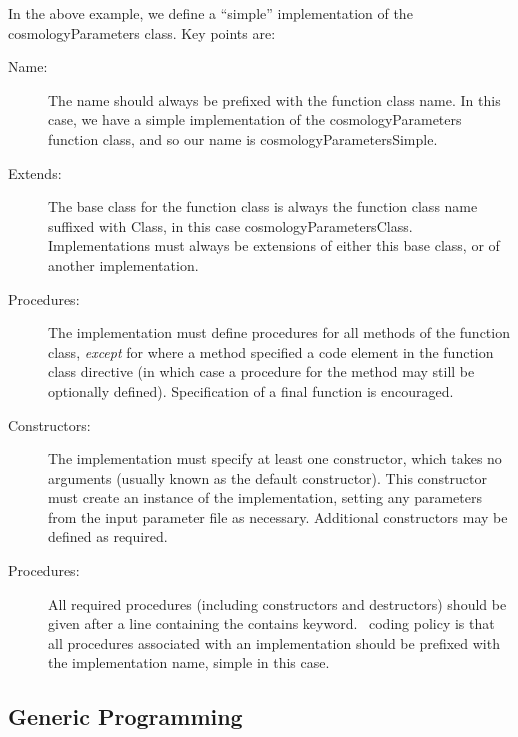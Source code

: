 In the above example, we define a ``simple'' implementation of the {\normalfont cosmologyParameters} class. Key points are:
\begin{description}
\item[Name:] The name should always be prefixed with the function class name. In this case, we have a {\normalfont \ttfamily simple} implementation of the {\normalfont \ttfamily cosmologyParameters} function class, and so our name is {\normalfont \ttfamily cosmologyParametersSimple}.
\item[Extends:] The base class for the function class is always the function class name suffixed with {\normalfont \ttfamily Class}, in this case {\normalfont \ttfamily cosmologyParametersClass}. Implementations must always be extensions of either this base class, or of another implementation.
\item[Procedures:] The implementation must define procedures for all methods of the function class, \emph{except} for where a method specified a {\normalfont \ttfamily code} element in the function class directive (in which case a procedure for the method may still be optionally defined). Specification of a {\normalfont \ttfamily final} function is encouraged.
\item[Constructors:] The implementation must specify at least one constructor, which takes no arguments (usually known as the default constructor). This constructor must create an instance of the implementation, setting any parameters from the input parameter file as necessary. Additional constructors may be defined as required.
\item[Procedures:] All required procedures (including constructors and destructors) should be given after a line containing the {\normalfont \ttfamily contains} keyword. \glc\ coding policy is that all procedures associated with an implementation should be prefixed with the implementation name, {\normalfont \ttfamily simple} in this case.
\end{description}

\subsection{Generic Programming}


